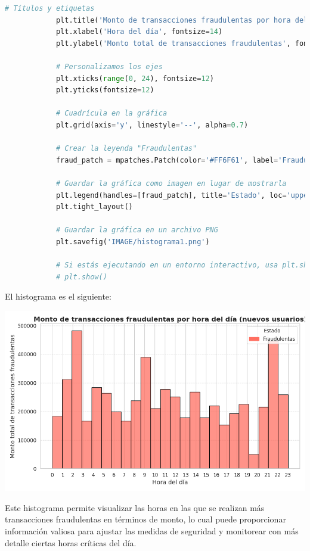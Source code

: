 \documentclass{article}
\begin{document}
\begin{itemize}
\begin{lstlisting}[language=Python, caption=Implementación del Histograma del monto de transacciones por hora del día]
            # Títulos y etiquetas
            plt.title('Monto de transacciones fraudulentas por hora del día (nuevos usuarios)', fontsize=16, fontweight='bold')
            plt.xlabel('Hora del día', fontsize=14)
            plt.ylabel('Monto total de transacciones fraudulentas', fontsize=14)
            
            # Personalizamos los ejes
            plt.xticks(range(0, 24), fontsize=12)
            plt.yticks(fontsize=12)
            
            # Cuadrícula en la gráfica
            plt.grid(axis='y', linestyle='--', alpha=0.7)
            
            # Crear la leyenda "Fraudulentas"
            fraud_patch = mpatches.Patch(color='#FF6F61', label='Fraudulentas')
            
            # Guardar la gráfica como imagen en lugar de mostrarla
            plt.legend(handles=[fraud_patch], title='Estado', loc='upper right', fontsize=12)
            plt.tight_layout()
            
            # Guardar la gráfica en un archivo PNG
            plt.savefig('IMAGE/histograma1.png')
            
            # Si estás ejecutando en un entorno interactivo, usa plt.show() en lugar de guardar.
            # plt.show()
        \end{lstlisting}

        El histograma es el siguiente:

        \begin{center}
            \includegraphics[scale=0.5]{IMAGE/histograma1.png}
        \end{center}

        Este histograma permite visualizar las horas en las que se realizan más transacciones fraudulentas en términos de monto, lo cual puede proporcionar información valiosa para ajustar las medidas de seguridad y monitorear con más detalle ciertas horas críticas del día.


\end{itemize}
\end{document}
